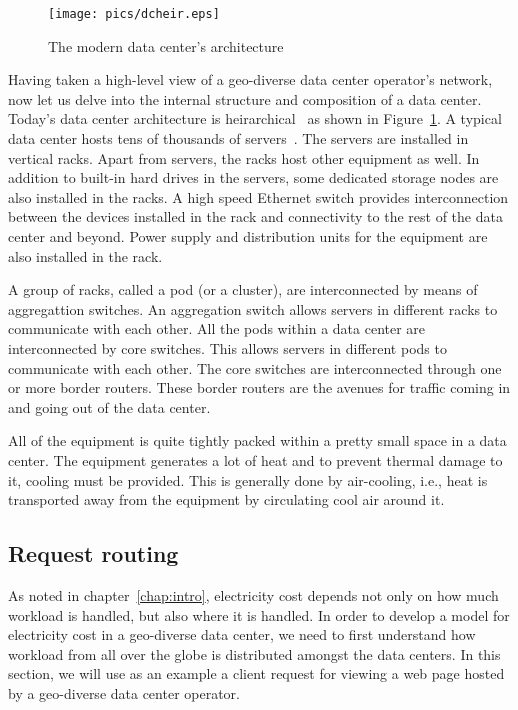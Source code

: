 \begin{figure}
\texttt{[image: pics/dcheir.eps]}
\caption{The modern data center's architecture}
\label{fig:dcheir}
\end{figure}

Having taken a high-level view of a geo-diverse data center operator's network, now let us delve into the internal structure and composition of a data center. Today's data center architecture is heirarchical~\cite{dcnetworking:vahdat:micro:2010} as shown in Figure~\ref{fig:dcheir}. A typical data center hosts tens of thousands of servers~\cite{Abts:2012:GTD:2184319.2184335}. The servers are installed in vertical racks. Apart from servers, the racks host other equipment as well. In addition to built-in hard drives in the servers, some dedicated storage nodes are also installed in the racks. A high speed Ethernet switch provides interconnection between the devices installed in the rack and connectivity to the rest of the data center and beyond. Power supply and distribution units for the equipment are also installed in the rack. 

A group of racks, called a pod (or a cluster), are interconnected by means of aggregattion switches. An aggregation switch allows servers in different racks to communicate with each other. All the pods within a data center are interconnected by core switches. This allows servers in different pods to communicate with each other. The core switches are interconnected through one or more border routers. These border routers are the avenues for traffic coming in and going out of the data center. 

All of the equipment is quite tightly packed within a pretty small space in a data center. The equipment generates a lot of heat and to prevent thermal damage to it, cooling must be provided. This is generally done by air-cooling, i.e., heat is transported away from the equipment by circulating cool air around it. 

\subsection{Request routing} 
As noted in chapter~\ref{chap:intro}, electricity cost depends not only on how much workload is handled, but also where it is handled. In order to develop a model for electricity cost in a geo-diverse data center, we need to first understand how workload from all over the globe is distributed amongst the data centers. In this section, we will use as an example a client request for viewing a web page hosted by a geo-diverse data center operator. 

